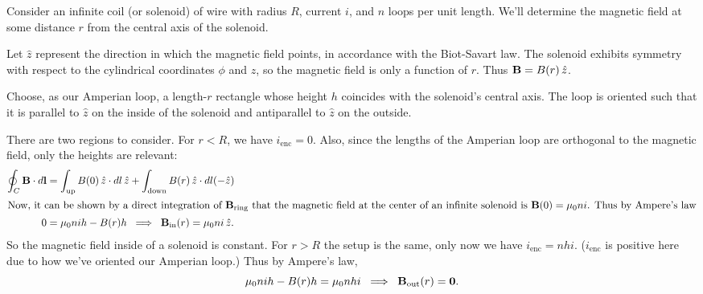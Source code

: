 \documentclass[../p051main.tex]{subfiles}
\begin{document}
\begin{example}
    Consider an infinite coil (or solenoid) of wire with radius $R$, current $i$, and $n$ loops per unit length.
    We'll determine the magnetic field at some distance $r$ from the central axis of the solenoid.

    Let $\hat z$ represent the direction in which the magnetic field points, in accordance with the Biot-Savart law.
    The solenoid exhibits symmetry with respect to the cylindrical coordinates $\phi$ and $z$, so the magnetic field is only a function of $r$.
    Thus $\mathbf{B} = B(r) \,\hat z$.

    Choose, as our Amperian loop, a length-$r$ rectangle whose height $h$ coincides with the solenoid's central axis.
    The loop is oriented such that it is parallel to $\hat z$ on the inside of the solenoid and antiparallel to $\hat z$ on the outside.

    There are two regions to consider.
    For $r < R$, we have $i_\textrm{enc} = 0$.
    Also, since the lengths of the Amperian loop are orthogonal to the magnetic field, only the heights are relevant:
    \begin{align*}
        \oint_C \mathbf{B} \cdot d\mathbf{l} &= \int_\textrm{up} B(0) \,\hat z \cdot dl \,\hat z + \int_\textrm{down} B(r) \,\hat z \cdot dl (-\hat z) \\
        \intertext{Now, it can be shown by a direct integration of $\mathbf{B}_\textrm{ring}$ that the magnetic field at the center of an infinite solenoid is $\mathbf{B}(0) = \mu_0 ni$. Thus by Ampere's law}
        0 &= \mu_0 ni h - B(r) h \;\implies\; \mathbf{B}_\textrm{in}(r) = \mu_0 ni \,\hat z.
    \end{align*}
    So the magnetic field inside of a solenoid is constant.
    For $r > R$ the setup is the same, only now we have $i_\textrm{enc} = nhi$.
    ($i_\textrm{enc}$ is positive here due to how we've oriented our Amperian loop.)
    Thus by Ampere's law,
    \[ \mu_0 nih - B(r)h = \mu_0 nhi \;\implies\; \mathbf{B}_\textrm{out}(r) = \mathbf{0}. \]
\end{example}
\end{document}
